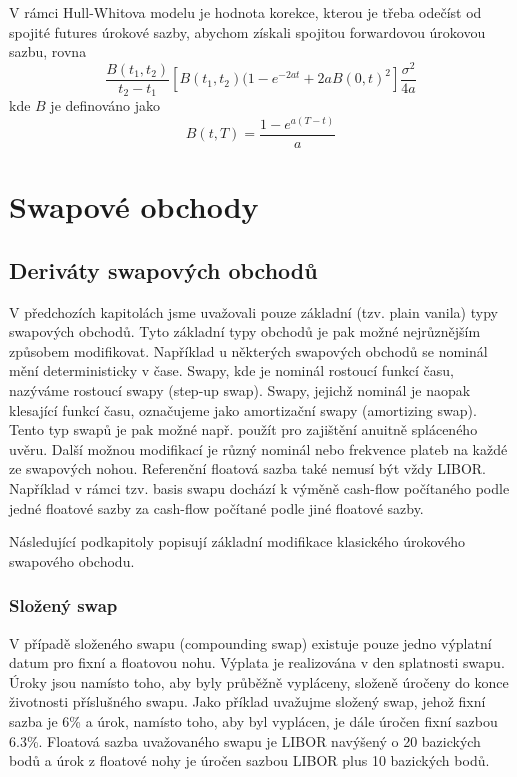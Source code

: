 \documentclass[a4paper]{book}
\begin{document}
V rámci Hull-Whitova modelu je hodnota korekce, kterou je třeba odečíst od spojité futures úrokové sazby, abychom získali spojitou forwardovou úrokovou sazbu, rovna
\begin{equation*}
\frac{B(t_1, t_2)}{t_2 - t_1}[B(t_1, t_2)(1 - e^{-2at} + 2aB(0,t)^2]\frac{\sigma^2}{4a}
\end{equation*}
kde $B$ je definováno jako
\begin{equation*}
B(t,T)=\frac{1 - e^{a(T-t)}}{a}
\end{equation*}

\section{Swapové obchody}

\subsection{Deriváty swapových obchodů}

V předchozích kapitolách jsme uvažovali pouze základní (tzv. plain vanila) typy swapových obchodů. Tyto základní typy obchodů je pak možné nejrůznějším způsobem modifikovat. Například u některých swapových obchodů se nominál mění deterministicky v čase. Swapy, kde je nominál rostoucí funkcí času, nazýváme rostoucí swapy (step-up swap). Swapy, jejichž nominál je naopak klesající funkcí času, označujeme jako amortizační swapy (amortizing swap). Tento typ swapů je pak možné např. použít pro zajištění anuitně spláceného uvěru. Další možnou modifikací je různý nominál nebo frekvence plateb na každé ze swapových nohou. Referenční floatová sazba také nemusí být vždy LIBOR. Například v rámci tzv. basis swapu dochází k výměně cash-flow počítaného podle jedné floatové sazby za cash-flow počítané podle jiné floatové sazby.

Následující podkapitoly popisují základní modifikace klasického úrokového swapového obchodu.

\subsubsection{Složený swap}

V případě složeného swapu (compounding swap) existuje pouze jedno výplatní datum pro fixní a floatovou nohu. Výplata je realizována v den splatnosti swapu. Úroky jsou namísto toho, aby byly průběžně vypláceny, složeně úročeny do konce životnosti příslušného swapu. Jako příklad uvažujme složený swap, jehož fixní sazba je 6\% a úrok, namísto toho, aby byl vyplácen, je dále úročen fixní sazbou 6.3\%. Floatová sazba uvažovaného swapu je LIBOR navýšený o 20 bazických bodů a úrok z floatové nohy je úročen sazbou LIBOR plus 10 bazických bodů.
\end{document}
